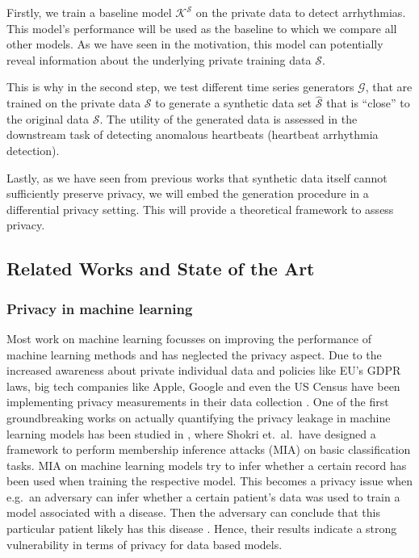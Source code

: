 Firstly, we train a baseline model \(\mathcal{K}^\mathcal{S}\) on the private data to detect arrhythmias. This model's performance will be used as the baseline to which we compare all other models. As we have seen in the motivation, this model can potentially reveal information about the underlying private training data $\mathcal{S}$.

This is why in the second step, we test different time series generators $\mathcal{G}$, that are trained on the private data $\mathcal{S}$ to generate a synthetic data set $\widehat{\mathcal{S}}$ that is ``close'' to the original data $\mathcal{S}$. The utility of the generated data is assessed in the downstream task of detecting anomalous heartbeats (heartbeat arrhythmia detection). 

Lastly, as we have seen from previous works that synthetic data itself cannot sufficiently preserve privacy, we will embed the generation procedure in a differential privacy setting. This will provide a theoretical framework to assess privacy.

\subsection{Related Works and State of the Art}

\subsubsection*{Privacy in machine learning}
Most work on machine learning focusses on improving the performance of machine learning methods and has neglected the privacy aspect. Due to the increased awareness about private individual data and policies like EU's GDPR laws, big tech companies like Apple, Google and even the US Census have been implementing privacy measurements in their data collection \parencite[see][]{dwork2019differential,abowd2019census}. One of the first groundbreaking works on actually quantifying the privacy leakage in machine learning models has been studied in \parencite{shokri2017membership}, where Shokri et.\ al.\ have designed a framework to perform membership inference attacks (MIA) on basic classification tasks. MIA on machine learning models try to infer whether a certain record has been used when training the respective model. This becomes a privacy issue when e.g.\ an adversary can infer whether a certain patient's data was used to train a model associated with a disease. Then the adversary can conclude that this particular patient likely has this disease \parencite[cf.][p. 5]{shokri2017membership}. Hence, their results indicate a strong vulnerability in terms of privacy for data based models.


